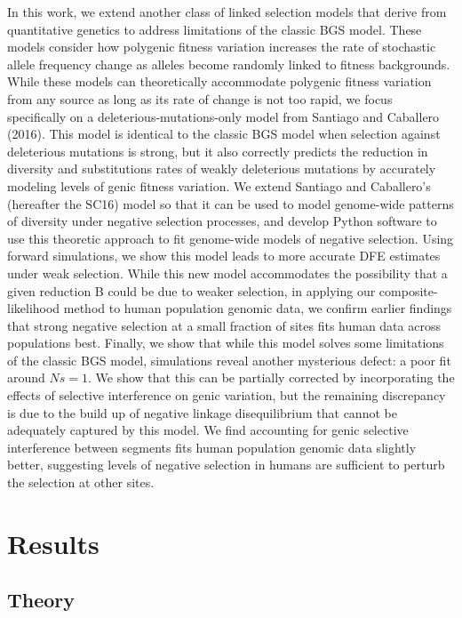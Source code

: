\documentclass[11pt]{article}
\begin{document}
In this work, we extend another class of linked selection models that derive
from quantitative genetics to address limitations of the classic BGS model.
These models consider how polygenic fitness variation increases the rate of
stochastic allele frequency change as alleles become randomly linked to fitness
backgrounds. While these models can theoretically accommodate polygenic fitness
variation from any source as long as its rate of change is not too rapid, we
focus specifically on a deleterious-mutations-only model from Santiago and
Caballero (2016). This model is identical to the classic BGS model when
selection against deleterious mutations is strong, but it also correctly
predicts the reduction in diversity and substitutions rates of weakly
deleterious mutations by accurately modeling levels of genic fitness variation.
We extend Santiago and Caballero’s (hereafter the SC16) model so that it can be
used to model genome-wide patterns of diversity under negative selection
processes, and develop Python software to use this theoretic approach to fit
genome-wide models of negative selection. Using forward simulations, we show
this model leads to more accurate DFE estimates under weak selection. While
this new model accommodates the possibility that a given reduction B could be
due to weaker selection, in applying our composite-likelihood method to human
population genomic data, we confirm earlier findings that strong negative
selection at a small fraction of sites fits human data across populations best.
Finally, we show that while this model solves some limitations of the classic
BGS model, simulations reveal another mysterious defect: a poor fit around
$Ns=1$. We show that this can be partially corrected by incorporating the effects
of selective interference on genic variation, but the remaining discrepancy is
due to the build up of negative linkage disequilibrium that cannot be
adequately captured by this model. We find accounting for genic selective
interference between segments fits human population genomic data slightly
better, suggesting levels of negative selection in humans are sufficient to
perturb the selection at other sites.


\section*{Results}
\subsection*{Theory}
\end{document}
